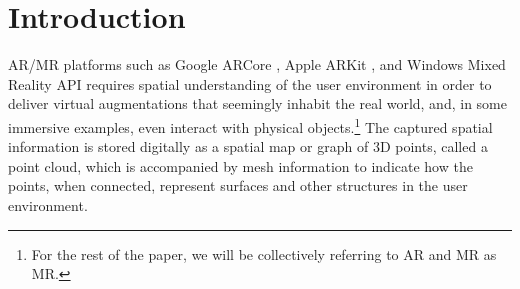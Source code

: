 \section{Introduction}


AR/MR platforms such as Google ARCore \cite{arcore}, Apple ARKit \cite{arkit}, and Windows Mixed Reality API \cite{windowsMRdev} requires spatial understanding of the user environment in order to deliver virtual augmentations that seemingly inhabit the real world, and, in some immersive examples, even interact with physical objects.\footnote{For the rest of the paper, we will be collectively referring to AR and MR as MR.} The captured spatial information is stored digitally as a spatial map or graph of 3D points, called a point cloud, which is accompanied by mesh information to indicate how the points, when connected, represent surfaces and other structures in the user environment. %


